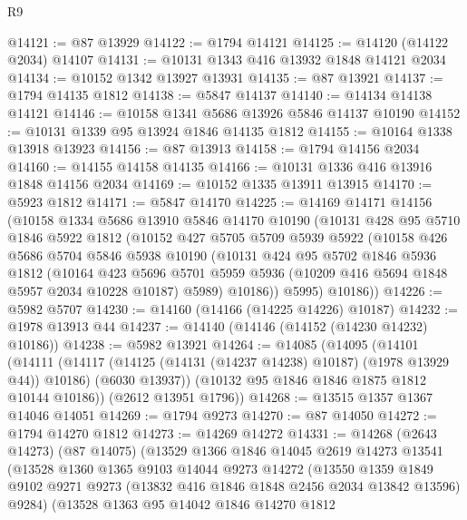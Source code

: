 \begin{lexlean}{R9}
\begin{coremodule}
@14121 := @87 @13929
@14122 := @1794 @14121
@14125 := @14120 (@14122 @2034) @14107
@14131 := @10131 @1343 @416 @13932 @1848 @14121 @2034
@14134 := @10152 @1342 @13927 @13931
@14135 := @87 @13921
@14137 := @1794 @14135 @1812
@14138 := @5847 @14137
@14140 := @14134 @14138 @14121
@14146 := @10158 @1341 @5686 @13926 @5846 @14137 @10190
@14152 := @10131 @1339 @95 @13924 @1846 @14135 @1812
@14155 := @10164 @1338 @13918 @13923
@14156 := @87 @13913
@14158 := @1794 @14156 @2034
@14160 := @14155 @14158 @14135
@14166 := @10131 @1336 @416 @13916 @1848 @14156 @2034
@14169 := @10152 @1335 @13911 @13915
@14170 := @5923 @1812
@14171 := @5847 @14170
@14225 := @14169
    @14171
    @14156
    (@10158
      @1334
      @5686
      @13910
      @5846
      @14170
      @10190
      (@10131
        @428
        @95
        @5710
        @1846
        @5922
        @1812
        (@10152
          @427
          @5705
          @5709
          @5939
          @5922
          (@10158
            @426
            @5686
            @5704
            @5846
            @5938
            @10190
            (@10131
              @424
              @95
              @5702
              @1846
              @5936
              @1812
              (@10164
                @423
                @5696
                @5701
                @5959
                @5936
                (@10209 @416 @5694 @1848 @5957 @2034 @10228 @10187)
                @5989)
              @10186))
          @5995)
        @10186))
@14226 := @5982 @5707
@14230 := @14160 (@14166 (@14225 @14226) @10187)
@14232 := @1978 @13913 @44
@14237 := @14140 (@14146 (@14152 (@14230 @14232) @10186))
@14238 := @5982 @13921
@14264 := @14085
    (@14095
      (@14101
        (@14111
          (@14117 (@14125 (@14131 (@14237 @14238) @10187) (@1978 @13929 @44)) @10186)
          (@6030 @13937))
        (@10132 @95 @1846 @1846 @1875 @1812 @10144 @10186))
      (@2612 @13951 @1796))
@14268 := @13515 @1357 @1367 @14046 @14051
@14269 := @1794 @9273
@14270 := @87 @14050
@14272 := @1794 @14270 @1812
@14273 := @14269 @14272
@14331 := @14268
    (@2643 @14273)
    (@87 @14075)
    (@13529
      @1366
      @1846
      @14045
      @2619
      @14273
      @13541
      (@13528
        @1360
        @1365
        @9103
        @14044
        @9273
        @14272
        (@13550
          @1359
          @1849
          @9102
          @9271
          @9273
          (@13832 @416 @1846 @1848 @2456 @2034 @13842 @13596)
          @9284)
        (@13528
          @1363
          @95
          @14042
          @1846
          @14270
          @1812

\end{coremodule}
\end{lexlean}
